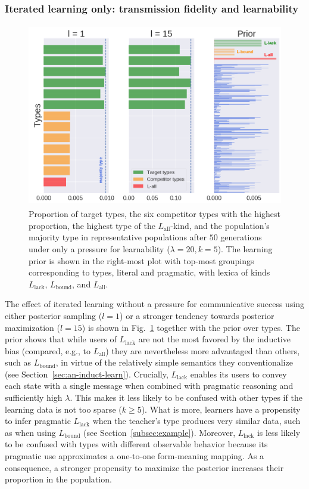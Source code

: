 \documentclass[a4paper, 11pt]{article}
\theoremstyle{Satz}
\newcommand{\mylang}[1]{\ensuremath{L_{\text{#1}}}\xspace} %
\newcommand{\Lall}{\mylang{all}}
\newcommand{\Lbound}{\mylang{bound}}
\newcommand{\Llack}{\mylang{lack}}
\begin{document}
\subsubsection{Iterated learning only: transmission fidelity and learnability}

\begin{figure}[t]
\centering
\includegraphics[width=1\textwidth,height=8cm,keepaspectratio]{./plots/barh-onlym}

\caption{Proportion of target types, the six competitor types with the highest proportion, the highest type of the $\Lall$-kind, and the population's majority type in representative populations after $50$ generations under only a
  pressure for learnability ($\lambda = 20, k = 5$). The learning prior is shown in the
  right-most plot with top-most groupings corresponding to types, literal and pragmatic, with
  lexica of kinds $\Llack$, $\Lbound$, and $\Lall$.}
\label{fig:only-M}
\end{figure}

The effect of iterated learning without a pressure for communicative success using either posterior
sampling ($l = 1$) or a stronger tendency towards posterior maximization ($l = 15$) is shown in
Fig.~\ref{fig:only-M} together with the prior over types. The prior shows that while users of
$\Llack$ are not the most favored by the inductive bias (compared, e.g., to $\Lall$) they are
nevertheless more advantaged than others, such as $\Lbound$, in virtue of the relatively simple
semantics they conventionalize (see Section~\ref{sec:an-induct-learn}). Crucially, $\Llack$
enables its users to convey each state with a single message when combined with pragmatic
reasoning and sufficiently high $\lambda$. This makes it less likely to be confused with
other types if the learning data is not too sparse ($k \geq 5$). What is more, learners have
a propensity to infer pragmatic $\Llack$ when the teacher's type produces very similar
data, such as when using $\Lbound$ (see Section~\ref{subsec:example}). Moreover, $\Llack$ is less likely to be confused with
types with different observable behavior because its pragmatic use approximates a one-to-one
form-meaning mapping. As a consequence, a stronger propensity to maximize the posterior
increases their proportion in the population.
\end{document}
